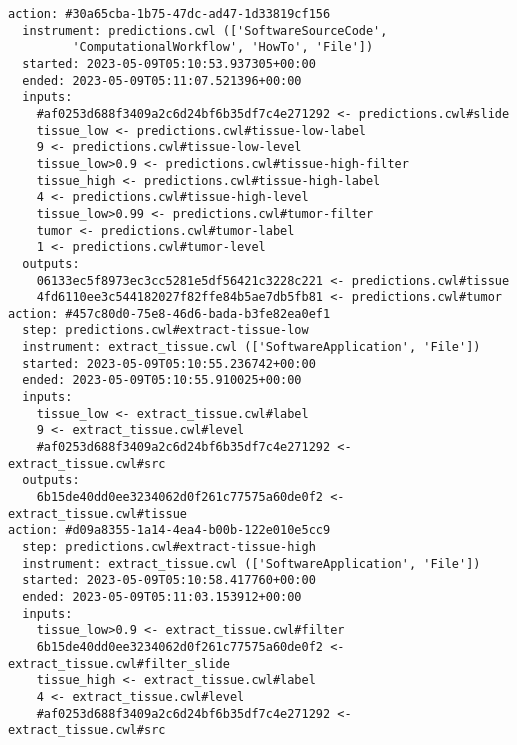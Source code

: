 \documentclass[10pt,letterpaper]{article}
\begin{document}
\begin{lstlisting}[float,basicstyle=\scriptsize\ttfamily,caption={Output of the \texttt{runcrate report} command executed on the Provenance Run Crate generated by StreamFlow in the digital pathology inference use case (Section~\ref{provenance-run-crate-for-digital-pathology}). This informal listing of relevant RO-Crate entities describes each step of the execution. Note that inputs and outputs are of different types (not shown): e.g., \texttt{tissue\_low>0.9} is a string parameter, \texttt{6b15de\dots} is a filename, and \texttt{\#af0253\dots} is a collection.},label={lst:ml_pipeline_streamflow_report}]
action: #30a65cba-1b75-47dc-ad47-1d33819cf156
  instrument: predictions.cwl (['SoftwareSourceCode', 
         'ComputationalWorkflow', 'HowTo', 'File'])
  started: 2023-05-09T05:10:53.937305+00:00
  ended: 2023-05-09T05:11:07.521396+00:00
  inputs:
    #af0253d688f3409a2c6d24bf6b35df7c4e271292 <- predictions.cwl#slide
    tissue_low <- predictions.cwl#tissue-low-label
    9 <- predictions.cwl#tissue-low-level
    tissue_low>0.9 <- predictions.cwl#tissue-high-filter
    tissue_high <- predictions.cwl#tissue-high-label
    4 <- predictions.cwl#tissue-high-level
    tissue_low>0.99 <- predictions.cwl#tumor-filter
    tumor <- predictions.cwl#tumor-label
    1 <- predictions.cwl#tumor-level
  outputs:
    06133ec5f8973ec3cc5281e5df56421c3228c221 <- predictions.cwl#tissue
    4fd6110ee3c544182027f82ffe84b5ae7db5fb81 <- predictions.cwl#tumor
action: #457c80d0-75e8-46d6-bada-b3fe82ea0ef1
  step: predictions.cwl#extract-tissue-low
  instrument: extract_tissue.cwl (['SoftwareApplication', 'File'])
  started: 2023-05-09T05:10:55.236742+00:00
  ended: 2023-05-09T05:10:55.910025+00:00
  inputs:
    tissue_low <- extract_tissue.cwl#label
    9 <- extract_tissue.cwl#level
    #af0253d688f3409a2c6d24bf6b35df7c4e271292 <- extract_tissue.cwl#src
  outputs:
    6b15de40dd0ee3234062d0f261c77575a60de0f2 <- extract_tissue.cwl#tissue
action: #d09a8355-1a14-4ea4-b00b-122e010e5cc9
  step: predictions.cwl#extract-tissue-high
  instrument: extract_tissue.cwl (['SoftwareApplication', 'File'])
  started: 2023-05-09T05:10:58.417760+00:00
  ended: 2023-05-09T05:11:03.153912+00:00
  inputs:
    tissue_low>0.9 <- extract_tissue.cwl#filter
    6b15de40dd0ee3234062d0f261c77575a60de0f2 <- extract_tissue.cwl#filter_slide
    tissue_high <- extract_tissue.cwl#label
    4 <- extract_tissue.cwl#level
    #af0253d688f3409a2c6d24bf6b35df7c4e271292 <- extract_tissue.cwl#src

\end{lstlisting}
\end{document}
